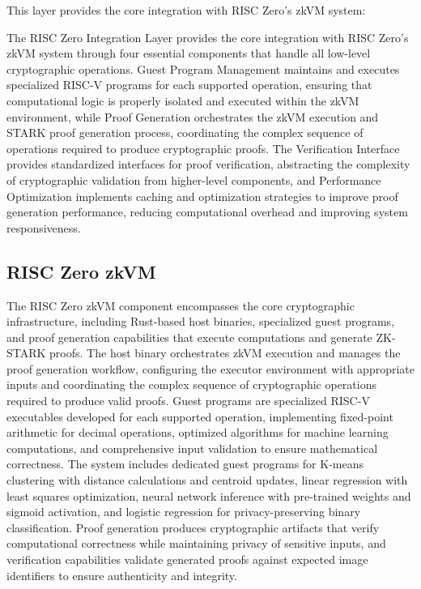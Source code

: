\documentclass[11pt]{article}
\begin{document}
This layer provides the core integration with RISC Zero's zkVM system:

The RISC Zero Integration Layer provides the core integration with RISC Zero's zkVM system through four essential components that handle all low-level cryptographic operations. Guest Program Management maintains and executes specialized RISC-V programs for each supported operation, ensuring that computational logic is properly isolated and executed within the zkVM environment, while Proof Generation orchestrates the zkVM execution and STARK proof generation process, coordinating the complex sequence of operations required to produce cryptographic proofs. The Verification Interface provides standardized interfaces for proof verification, abstracting the complexity of cryptographic validation from higher-level components, and Performance Optimization implements caching and optimization strategies to improve proof generation performance, reducing computational overhead and improving system responsiveness.

\subsection{RISC Zero zkVM}

The RISC Zero zkVM component encompasses the core cryptographic infrastructure, including Rust-based host binaries, specialized guest programs, and proof generation capabilities that execute computations and generate ZK-STARK proofs. The host binary orchestrates zkVM execution and manages the proof generation workflow, configuring the executor environment with appropriate inputs and coordinating the complex sequence of cryptographic operations required to produce valid proofs. Guest programs are specialized RISC-V executables developed for each supported operation, implementing fixed-point arithmetic for decimal operations, optimized algorithms for machine learning computations, and comprehensive input validation to ensure mathematical correctness. The system includes dedicated guest programs for K-means clustering with distance calculations and centroid updates, linear regression with least squares optimization, neural network inference with pre-trained weights and sigmoid activation, and logistic regression for privacy-preserving binary classification. Proof generation produces cryptographic artifacts that verify computational correctness while maintaining privacy of sensitive inputs, and verification capabilities validate generated proofs against expected image identifiers to ensure authenticity and integrity.
\end{document}
